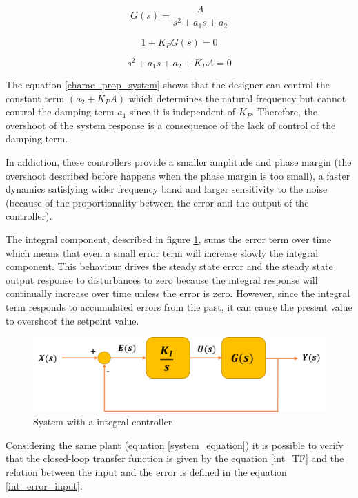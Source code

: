 \begin{equation}\label{system_equation}
G(s)= \frac{A}{s^2 + a_{1}s + a_{2}}
\end{equation}

\begin{equation}\label{charac_equation1}
1 + K_PG(s)=0
\end{equation}

\begin{equation}\label{charac_prop_system}
s^2 + a_{1}s + a_{2} + K_PA=0
\end{equation}

The equation \ref{charac_prop_system} shows that the designer can control the constant term $(a_{2} + K_PA)$ which determines the natural frequency but cannot control the damping term $a_{1}$ since it is independent of $K_{P}$. Therefore, the overshoot of the system response is a consequence of the lack of control of the damping term.

In addiction, these controllers provide a smaller amplitude and phase margin (the overshoot described before happens when the phase margin is too small), a faster dynamics satisfying wider frequency band and larger sensitivity to the noise (because of the proportionality between the error and the output of the controller).

The integral component, described in figure \ref{integ_controller}, sums the error term over time which means that even a small error term will increase slowly the integral component. This behaviour drives the steady state error and the steady state output response to disturbances to zero because the integral response will continually increase over time unless the error is zero. However, since the integral term responds to accumulated errors from the past, it can cause the present value to overshoot the setpoint value.

\begin{figure}[H]
	\centering
	\includegraphics[scale=0.6]{figures/integ_controller.png}
	\caption{System with a integral controller}
	\label{integ_controller}
\end{figure}

Considering the same plant (equation \ref{system_equation}) it is possible to verify that the closed-loop transfer function is given by the equation \ref{int_TF} and the relation between the input and the error is defined in the equation \ref{int_error_input}.

